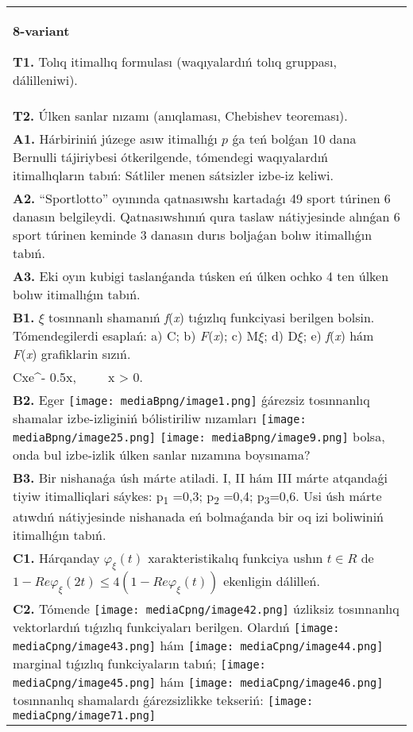 \documentclass{article}
\begin{document}
\begin{tabular}{m{17cm}}
\textbf{8-variant}
\newline

\textbf{T1.} Tolıq itimallıq formulası (waqıyalardıń tolıq gruppası, dálilleniwi).
 \\
\textbf{T2.} 
Úlken sanlar nızamı (anıqlaması, Chebishev teoreması).
 \\
\textbf{A1.} Hárbiriniń júzege asıw itimallıǵı $p$ ǵa teń bolǵan 10 dana Bernulli tájiriybesi ótkerilgende, tómendegi waqıyalardıń itimallıqların tabıń: Sátliler menen sátsizler izbe-iz keliwi.
 \\
\textbf{A2.} “Sportlotto” oyınında qatnasıwshı kartadaǵı 49 sport túrinen 6 danasın belgileydi. Qatnasıwshınıń qura taslaw nátiyjesinde alınǵan 6 sport túrinen keminde 3 danasın durıs boljaǵan bolıw itimallıǵın tabıń.
 \\
\textbf{A3.} Eki oyın kubigi taslanǵanda túsken eń úlken ochko 4 ten úlken bolıw itimallıǵın tabıń.
 \\
\textbf{B1.} $\xi$ tosınnanlı shamanıń \emph{f}(\emph{x}) tıǵızlıq funkciyasi berilgen bolsin. Tómendegilerdi esaplań: a) C; b) \emph{F}(\emph{x}); c) M$\xi$; d) D$\xi$; e) \emph{f}(\emph{x}) hám \emph{F}(\emph{x}) grafiklarin sızıń.\(f(x) = \left\{ \begin{matrix}
\ \ \ \ \ \ \ \ 0,\ \ \ \ \ \ x \leq 0, \\
Cxe^{- 0.5x},\ \ \ \ \ x > 0.\ \ 
\end{matrix} \right.\ \)
 \\
\textbf{B2.} Eger \texttt{[image: mediaBpng/image1.png]} ǵárezsiz tosınnanlıq shamalar izbe-izliginiń bólistiriliw nızamları
\texttt{[image: mediaBpng/image25.png]} \texttt{[image: mediaBpng/image9.png]}
bolsa, onda bul izbe-izlik úlken sanlar nızamına boysınama?
 \\
\textbf{B3.} Bir nishanaǵa úsh márte atiladi. I, II hám III márte atqandaǵi tiyiw itimalliqlari sáykes: p\textsubscript{1} =0,3; p\textsubscript{2} =0,4; p\textsubscript{3}=0,6. Usi úsh márte atıwdıń nátiyjesinde nishanada eń bolmaǵanda bir oq izi boliwiniń itimallıǵın tabıń.
 \\
\textbf{C1.} Hárqanday \(\varphi_{\xi}(t)\) xarakteristikalıq funkciya ushın \(t \in R\) de \(1 - Re\varphi_{\xi}(2t) \leq 4\left( 1 - Re\varphi_{\xi}(t) \right)\) ekenligin dálilleń.
 \\
\textbf{C2.} Tómende \texttt{[image: mediaCpng/image42.png]} úzliksiz tosınnanlıq vektorlardıń tıǵızlıq funkciyaları berilgen. Olardıń \texttt{[image: mediaCpng/image43.png]} hám \texttt{[image: mediaCpng/image44.png]} marginal tıǵızlıq funkciyaların tabıń; \texttt{[image: mediaCpng/image45.png]} hám \texttt{[image: mediaCpng/image46.png]} tosınnanlıq shamalardı ǵárezsizlikke tekseriń: \texttt{[image: mediaCpng/image71.png]} \\

\end{tabular}
\end{document}
